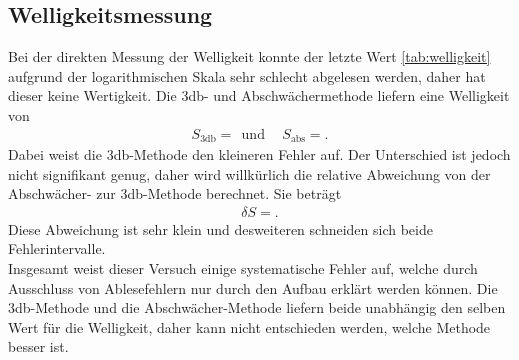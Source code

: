 \subsection{Welligkeitsmessung}
Bei der direkten Messung der Welligkeit konnte der letzte Wert \ref{tab:welligkeit} aufgrund der logarithmischen Skala sehr schlecht abgelesen werden, daher hat dieser keine Wertigkeit.
Die 3db- und Abschwächermethode liefern eine Welligkeit von
\begin{align*}
  S_{3\text{db}} =  \:\: \text{und}& \:\: S_\text{abs} = .
\end{align*}
Dabei weist die 3db-Methode den kleineren Fehler auf.
Der Unterschied ist jedoch nicht signifikant genug, daher wird willkürlich die relative Abweichung von der Abschwächer- zur 3db-Methode berechnet.
Sie beträgt
\begin{align*}
  \delta S = .
\end{align*}
Diese Abweichung ist sehr klein und desweiteren schneiden sich beide Fehlerintervalle.\\
Insgesamt weist dieser Versuch einige systematische Fehler auf, welche durch Ausschluss von Ablesefehlern nur durch den Aufbau erklärt werden können.
Die 3db-Methode und die Abschwächer-Methode liefern beide unabhängig den selben Wert für die Welligkeit, daher kann nicht entschieden werden, welche Methode besser ist.
